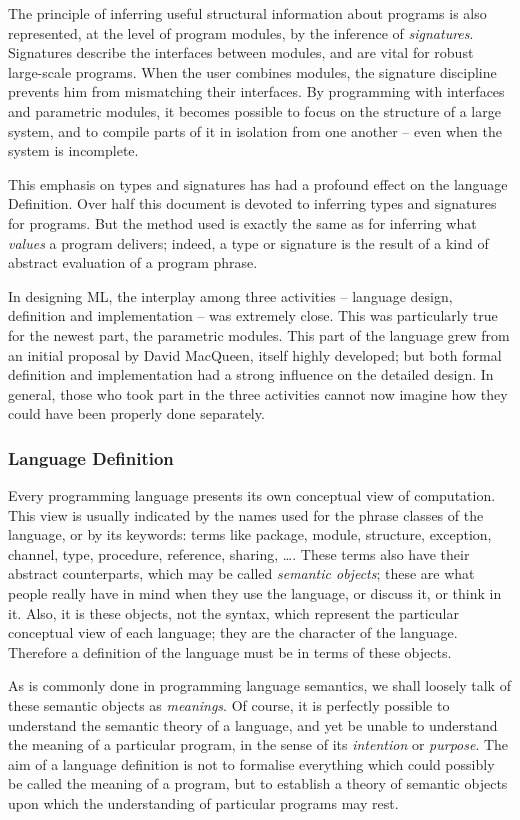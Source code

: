The principle of inferring useful structural information about programs
is also represented, at the level of program modules, by the inference of
{\sl signatures}.
Signatures describe the interfaces between modules, and are vital for robust
large-scale programs.  When the user combines modules, the signature
discipline prevents him from mismatching their interfaces.  By programming
with interfaces and parametric modules, it becomes possible to focus on the
structure of a large system, and to compile parts of it in isolation from
one another -- even when the system is incomplete.

This emphasis on types and signatures has had a profound effect on the
language Definition. Over half this document is devoted to inferring types
and signatures for programs.  But the method used is exactly the same as for
inferring what {\sl values} a program delivers; indeed, a type or signature is
the result of a kind of abstract evaluation of a program phrase.

In designing ML,
the interplay among three activities -- language design, definition and
implementation -- was extremely close. This was particularly true for the
newest part, the parametric modules. This part of the language grew from an
initial proposal by David MacQueen, itself highly developed; but both
formal definition and implementation had a strong influence on the detailed
design.  In general, those who took part in the three activities cannot now
imagine how they could have been properly done separately.

\subsubsection*{Language Definition}
Every programming language presents  its own conceptual view of
computation.  This view is usually indicated by the names used for the phrase
classes of the language, or by its keywords: terms like package, module,
structure, exception, channel, type, procedure, reference, sharing, \ldots.
These terms also have their abstract counterparts,  which may be called
{\sl semantic objects}; these are what people really have in mind when they use
the language, or discuss it, or think in it.  Also, it is these objects,
not the syntax, which represent the particular conceptual view of each
language; they are the character of the language.  Therefore a definition
of the language must be in terms of these objects.

As is commonly done in programming language semantics, we shall loosely
talk of these semantic objects as {\sl meanings}. Of course, it is
perfectly possible to understand the semantic theory of a language, and
yet be unable to understand the meaning of a particular program, in the
sense of its {\sl intention} or {\sl purpose}.  The aim of a language
definition is not to formalise everything which could possibly be called the
meaning of a program, but to establish a theory of semantic objects
upon which the understanding of particular programs may rest.

